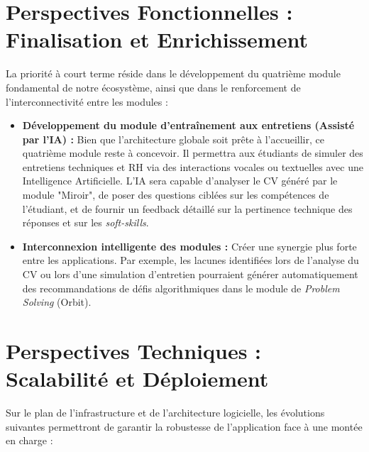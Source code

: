 \documentclass[12pt,a4paper]{report}
\begin{document}
	\section*{Perspectives Fonctionnelles : Finalisation et Enrichissement}
	
	La priorité à court terme réside dans le développement du quatrième module fondamental de notre écosystème, ainsi que dans le renforcement de l'interconnectivité entre les modules :
	
	\begin{itemize}
		\item \textbf{Développement du module d'entraînement aux entretiens (Assisté par l'IA) :} Bien que l'architecture globale soit prête à l'accueillir, ce quatrième module reste à concevoir. Il permettra aux étudiants de simuler des entretiens techniques et RH via des interactions vocales ou textuelles avec une Intelligence Artificielle. L'IA sera capable d'analyser le CV généré par le module "Miroir", de poser des questions ciblées sur les compétences de l'étudiant, et de fournir un feedback détaillé sur la pertinence technique des réponses et sur les \textit{soft-skills}.
		\item \textbf{Interconnexion intelligente des modules :} Créer une synergie plus forte entre les applications. Par exemple, les lacunes identifiées lors de l'analyse du CV ou lors d'une simulation d'entretien pourraient générer automatiquement des recommandations de défis algorithmiques dans le module de \textit{Problem Solving} (Orbit).
	\end{itemize}
	
	\section*{Perspectives Techniques : Scalabilité et Déploiement}
	
	Sur le plan de l'infrastructure et de l'architecture logicielle, les évolutions suivantes permettront de garantir la robustesse de l'application face à une montée en charge :
	
\end{document}
